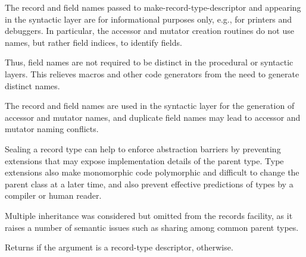 \begin{entry}{%
}
\begin{rationale}
  The record and field names passed to
  {\cf make-record-type-descriptor} and appearing in the 
  syntactic layer are for informational purposes only, e.g., for
  printers and debuggers.
  In particular, the accessor and mutator creation routines do not use
  names, but rather field indices, to identify fields.
  
  Thus, field names are not required to be distinct in the procedural or
  syntactic layers.
  This relieves macros and other code generators from the need to
  generate distinct names.

  The record and field names are used in the syntactic
  layer for the generation of accessor and mutator names, and duplicate
  field names may lead to accessor and mutator naming conflicts.
\end{rationale}

\begin{rationale}
  Sealing a record type can help to enforce abstraction barriers by preventing
  extensions that may expose implementation details of the parent type.
  Type extensions also make monomorphic code polymorphic and
  difficult to change the parent class at a later time, and also
  prevent effective predictions of types by a compiler or human
  reader.
\end{rationale}

\begin{rationale}
  Multiple inheritance was considered but omitted from the records
  facility, as it raises a number of semantic issues such as
  sharing among common parent types.
\end{rationale}
\end{entry}

\begin{entry}{%
}
   
Returns \schtrue{} if the argument is a record-type descriptor,
\schfalse{} otherwise.
\end{entry}

